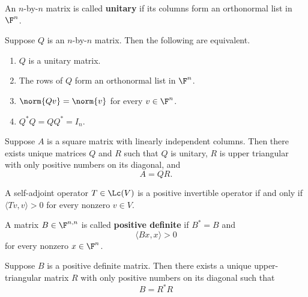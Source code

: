 \documentclass{extarticle}
\begin{document}
\begin{definition}
    An \(n\)-by-\(n\) matrix is called \textbf{unitary} if its columns form an orthonormal list in \(\F^n\).
\end{definition}

\begin{thm}
    Suppose \(Q\) is an \(n\)-by-\(n\) matrix. Then the following are equivalent.
    \begin{enumerate}[label=(\alph*)]
        \item \(Q\) is a unitary matrix.
        \item The rows of \(Q\) form an orthonormal list in \(\F^n\).
        \item \(\norm{Qv} = \norm{v}\) for every \(v \in \F^n\).
        \item \(Q^* Q = Q Q^* = I_n\).
    \end{enumerate}
\end{thm}

\begin{thm}[QR factorization]
    Suppose \(A\) is a square matrix with linearly independent columns. Then there exists
    unique matrices \(Q\) and \(R\) such that \(Q\) is unitary, \(R\) is upper triangular
    with only positive numbers on its diagonal, and
    \[A = QR.\]
\end{thm}

\begin{lemma}
    A self-adjoint operator \(T \in \Lc(V)\) is a positive invertible operator if and only
    if \(\langle Tv,v \rangle > 0\) for every nonzero \(v \in V\).
\end{lemma}

\begin{definition}
    A matrix \(B \in \F^{n, n}\) is called \textbf{positive definite} if \(B^* = B\) and
    \[\langle Bx,x \rangle > 0\]
    for every nonzero \(x \in \F^n\).
\end{definition}

\begin{thm}
    Suppose \(B\) is a positive definite matrix. Then there exists a unique upper-triangular
    matrix \(R\) with only positive numbers on its diagonal such that
    \[B = R^* R\]
\end{thm}

\end{document}
